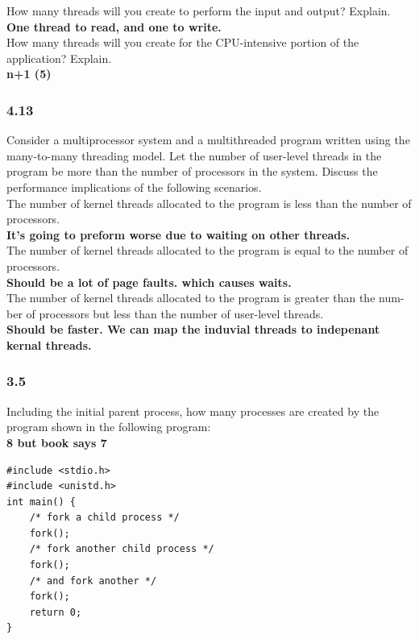 \documentclass[a4paper,10pt,titlepage]{report}
\begin{document}
How many threads will you create to perform the input and output? Explain.\\
\textbf{One thread to read, and one to write.}\\

How many threads will you create for the CPU-intensive portion of the application? Explain.\\
\textbf{n+1 (5)}\\\vspace{5mm}

\subsubsection{4.13}
Consider a multiprocessor system and a multithreaded program written using the many-to-many threading model. Let the number of user-level threads in the program be more than the number of processors in the system. Discuss the performance implications of the following scenarios.\\



The number of kernel threads allocated to the program is less than the number of processors.\\
\textbf{It's going to preform worse due to waiting on other threads.} \\


The number of kernel threads allocated to the program is equal to the number of processors.\\
\textbf{Should be a lot of page faults. which causes waits.} \\


The number of kernel threads allocated to the program is greater than the num- ber of processors but less than the number of user-level threads. \\

\textbf{Should be faster. We can map the induvial threads to indepenant kernal threads.} \\\vspace{5mm}

\subsubsection{3.5}
Including the initial parent process, how many processes are created by the program shown in the following program:\\


\textbf{8 but book says 7 }\\
\begin{lstlisting}[frame=single]
#include <stdio.h>
#include <unistd.h>
int main() {
    /* fork a child process */
    fork();
    /* fork another child process */
    fork();
    /* and fork another */
    fork();
    return 0;
}
\end{lstlisting}
\end{document}
